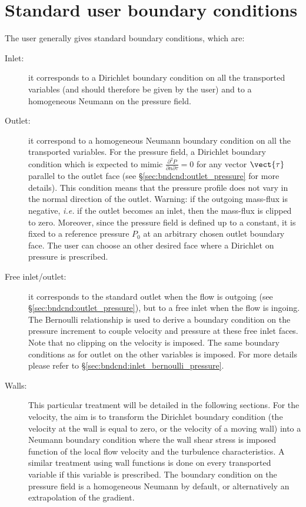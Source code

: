 \section{Standard user boundary conditions}

The user generally gives standard boundary conditions, which are:

\begin{description}
\item[Inlet:] it corresponds to a Dirichlet boundary condition on all the transported variables
(and should therefore be given by the user)
and to a homogeneous Neumann on the pressure field.

\item[Outlet:] it correspond to a homogeneous Neumann boundary condition on all the transported variables.
For the pressure field, a Dirichlet boundary condition which is expected to mimic $\displaystyle\frac{\partial^2 P}{\partial n \partial \tau}=0$ for any vector  $\vect{\tau}$ parallel to the outlet face
(see \S \ref{sec:bndcnd:outlet_pressure} for more details).
This condition means that the pressure
profile does not vary in the normal direction of the outlet. Warning: if the outgoing mass-flux is negative,
\emph{i.e.} if the outlet becomes an inlet, then the mass-flux is clipped to zero. Moreover, since
 the pressure field is defined up to a constant, it is fixed to a reference pressure $P_0$
at an arbitrary chosen outlet boundary face.
The user can choose an other desired face where a Dirichlet on pressure is prescribed.

\item[Free inlet/outlet:] it corresponds to the standard outlet when the flow is outgoing (see \S \ref{sec:bndcnd:outlet_pressure}), but to a free inlet when the flow
is ingoing. The Bernoulli relationship is used to derive a boundary condition on the pressure increment to couple velocity and pressure at
these free inlet faces.
Note that no clipping on the velocity is imposed.
The same boundary conditions as for outlet on the other variables is imposed. For more details please refer to \S \ref{sec:bndcnd:inlet_bernoulli_pressure}.


\item[Walls:] This particular treatment will be detailed in the following sections.
For the velocity, the aim is to transform the Dirichlet boundary condition (the velocity at the wall
is equal to zero, or the velocity of a moving wall) into a Neumann boundary condition where the wall shear stress
is imposed function of the local flow velocity and the turbulence characteristics.
A similar treatment using wall functions is done on every transported variable if this variable is prescribed.
The boundary condition on the pressure field is a homogeneous Neumann by default, or alternatively an extrapolation of the gradient.


\end{description}
